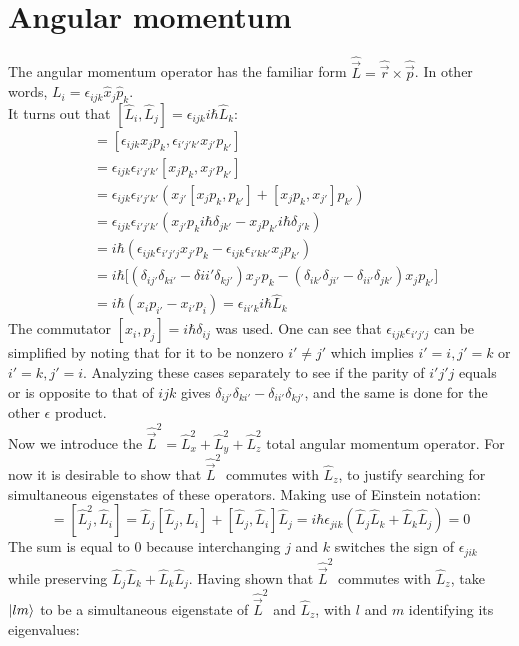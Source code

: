 \documentclass{article}
\begin{document}
\section{Angular momentum}
The angular momentum operator has the familiar form $\hat{\vec{L}}  = \hat{\vec{r}} \times \hat{\vec{p}}$. In other words, $L_i = \epsilon_{ijk}\hat{x}_j\hat{p}_k$. \\
It turns out that $[\hat{L}_i, \hat{L}_j] = \epsilon_{ijk}i\hbar \hat{L}_k$:
\begin{align*}
[\hat{L}_i, \hat{L}_{i'}] &= [\epsilon_{ijk}x_jp_k, \epsilon_{i'j'k'}x_{j'}p_{k'}] \\
&= \epsilon_{ijk}\epsilon_{i'j'k'} [x_jp_k, x_{j'}p_{k'}] \\
&= \epsilon_{ijk}\epsilon_{i'j'k'}(x_{j'}[x_{j}p_k, p_{k'}] + [x_jp_k, x_{j'}]p_{k'}) \\
&= \epsilon_{ijk}\epsilon_{i'j'k'}(x_{j'}p_{k}i\hbar \delta_{jk'} - x_jp_{k'}i\hbar \delta_{j'k}) \\
&= i\hbar(\epsilon_{ijk}\epsilon_{i'j'j} x_{j'}p_k - \epsilon_{ijk}\epsilon_{i'kk'} x_jp_{k'}) \\
&= i\hbar\big[(\delta_{ij'}\delta_{ki'} - \delta{ii'}\delta_{kj'})x_{j'}p_k - (\delta_{ik'}\delta_{ji'} - \delta_{ii'}\delta_{jk'})x_jp_{k'} \big] \\
&= i\hbar(x_ip_{i'} - x_{i'}p_i) = \epsilon_{ii'k} i\hbar \hat{L}_k
\end{align*}
The commutator $[x_i, p_j] = i\hbar \delta_{ij}$ was used. One can see that $\epsilon_{ijk}\epsilon_{i'j'j}$ can be simplified by noting that for it to be nonzero $i' \neq j'$ which implies $i'=i, j'=k$ or $i'=k, j'=i$. Analyzing these cases separately to see if the parity of $i'j'j$ equals or is opposite to that of $ijk$ gives $\delta_{ij'}\delta_{ki'} - \delta_{ii'}\delta_{kj'}$, and the same is done for the other $\epsilon$ product. \\
Now we introduce the $\hat{\vec{L}}^2 = \hat{L}_x^2 + \hat{L}_y^2 + \hat{L}_z^2$ total angular momentum operator. For now it is desirable to show that $\hat{\vec{L}}^2$ commutes with $\hat{L}_z$, to justify searching for simultaneous eigenstates of these operators. Making use of Einstein notation:
\begin{equation*}
[\hat{\vec{L}}^2, \hat{L}_i] = [\hat{L}_j^2, \hat{L}_i] = \hat{L}_j[\hat{L}_j, \hat{L}_i] + [\hat{L}_j, \hat{L}_i]\hat{L}_j = i\hbar\epsilon_{jik}(\hat{L}_j\hat{L}_k + \hat{L}_k\hat{L}_j) =0
\end{equation*}
The sum is equal to 0 because interchanging $j$ and $k$ switches the sign of $\epsilon_{jik}$ while preserving $\hat{L}_j\hat{L}_k + \hat{L}_k\hat{L}_j$. Having shown that $\hat{\vec{L}}^2$ commutes with $\hat{L}_z$, take $\ket{lm}$ to be a simultaneous eigenstate of $\hat{\vec{L}}^2$ and $\hat{L}_z$, with $l$ and $m$ identifying its eigenvalues:
\end{document}
